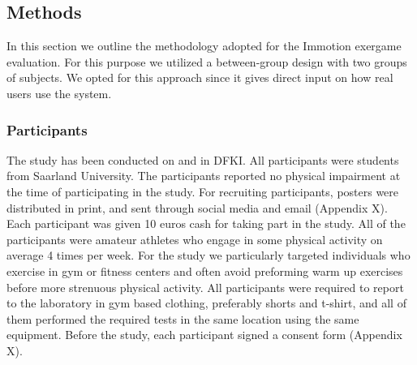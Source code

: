 \subsection{Methods} 
In this section we outline the methodology adopted for the Immotion exergame evaluation. For this purpose we utilized a between-group design with two groups of subjects. We opted for this approach since it gives direct input on how real users use the system. %
%
\subsubsection{Participants}
The study has been conducted on  and  in DFKI. All participants were students from Saarland University. The participants reported no physical impairment at the time of participating in the study. For recruiting participants, posters were distributed in print, and sent through social media and email (Appendix X). Each participant was given 10 euros cash for taking part in the study. All of the participants were amateur athletes who engage in some physical activity on average 4 times per week. For the study we particularly targeted individuals who exercise in gym or fitness centers and often avoid preforming warm up exercises before more strenuous physical activity. All participants were required to report to the laboratory in gym based clothing, preferably shorts and t-shirt, and all of them performed the required tests in the same location using the same equipment. Before the study, each participant signed a consent form (Appendix X).%
